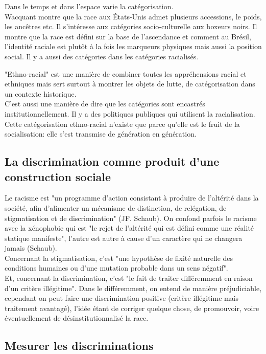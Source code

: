 \documentclass[12pt, a4paper, openany]{book}
\begin{document}
Dans le temps et dans l'espace varie la catégorisation. \\
Wacquant montre que la race aux États-Unis admet plusieurs accessions, le poids, les ancêtres etc. Il s'intéresse aux catégories socio-culturelle aux boxeurs noirs. Il montre que la race est défini sur la base de l'ascendance et comment au Brésil, l'identité raciale est plutôt à la fois les marqueurs physiques mais aussi la position social. Il y a aussi des catégories dans les catégories racialisés.


"Ethno-racial" est une manière de combiner toutes les appréhensions racial et ethniques mais sert surtout à montrer les objets de lutte, de catégorisation dans un contexte historique. \\
C'est aussi une manière de dire que les catégories sont encastrés institutionnellement. Il y a des politiques publiques qui utilisent la racialisation. \\
Cette catégorisation ethno-racial n'existe que parce qu'elle est le fruit de la socialisation: elle s'est transmise de génération en génération.


\subsection{La discrimination comme produit d'une construction sociale}

Le racisme est "un programme d'action consistant à produire de l'altérité dans la société, afin d'alimenter un mécanisme de distinction, de relégation, de stigmatisation et de discrimination" (JF. Schaub). On confond parfois le racisme avec la xénophobie qui est "le rejet de l'altérité qui est défini comme une réalité statique manifeste", l'autre est autre à cause d'un caractère qui ne changera jamais (Schaub). \\
Concernant la stigmatisation, c'est "une hypothèse de fixité naturelle des conditions humaines ou d'une mutation probable dans un sens négatif". \\
Et, concernant la discrimination, c'est "le fait de traiter différemment en raison d'un critère illégitime". Dans le différemment, on entend de manière préjudiciable, cependant on peut faire une discrimination positive (critère illégitime mais traitement avantagé), l'idée étant de corriger quelque chose, de promouvoir, voire éventuellement de désinstitutionnalisé la race.


\subsection{Mesurer les discriminations}
\end{document}
